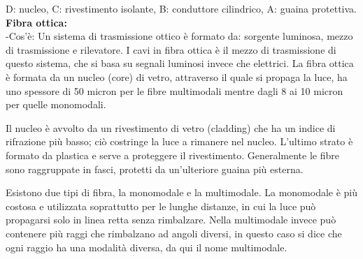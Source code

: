  
D: nucleo, C: rivestimento isolante, B: conduttore cilindrico, A: guaina protettiva. \\
\textbf{Fibra ottica:}\\
-Cos’è: Un sistema di trasmissione ottico è formato da: sorgente luminosa, mezzo di trasmissione e rilevatore. I cavi in fibra ottica è il mezzo di trasmissione di questo sistema, che si basa su segnali luminosi invece che elettrici.
La fibra ottica è formata da un nucleo (core) di vetro, attraverso il quale si propaga la luce, ha uno spessore di 50 micron per le fibre multimodali mentre dagli 8 ai 10 micron per quelle monomodali.

Il nucleo è avvolto da un rivestimento di vetro (cladding) che ha un indice di rifrazione più basso; ciò costringe la luce a rimanere nel nucleo. L’ultimo strato è formato da plastica e serve a proteggere il rivestimento. Generalmente le fibre sono raggruppate in fasci, protetti da un’ulteriore guaina più esterna.  


Esistono due tipi di fibra, la monomodale e la multimodale. La monomodale è più costosa e utilizzata soprattutto per le lunghe distanze, in cui la luce può propagarsi solo in linea retta senza rimbalzare.
Nella multimodale invece può contenere più raggi che rimbalzano ad angoli diversi, in questo caso si dice che ogni raggio ha una modalità diversa, da qui il nome multimodale.

